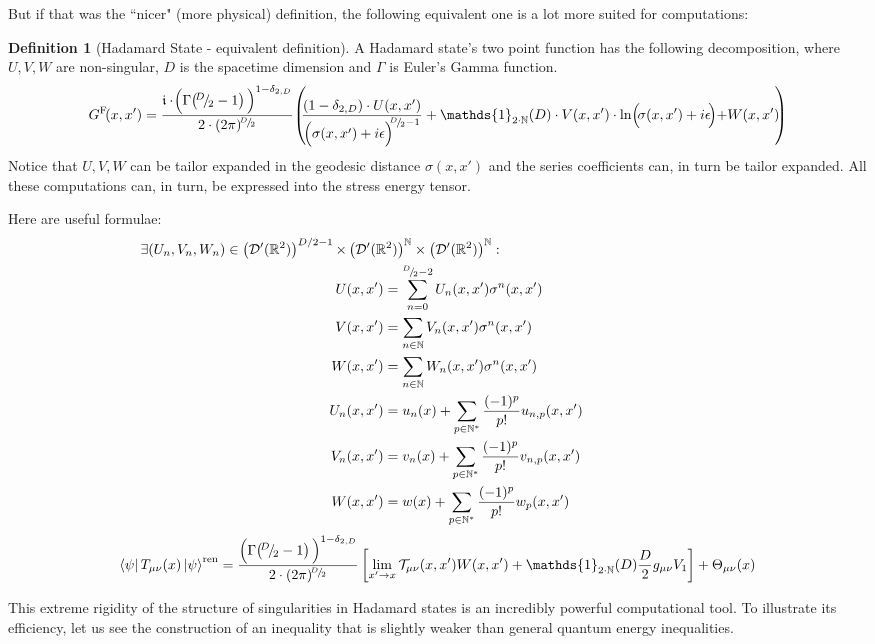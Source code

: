 \documentclass[a4paper,11pt]{article}
\numberwithin{equation}{section}
\theoremstyle{definition}
\newtheorem{definition}{Definition}
\begin{document}
But if that was the ``nicer" (more physical) definition, the following equivalent one is a lot more suited for computations:
\begin{definition}[Hadamard State - equivalent definition]
    A Hadamard state's two point function has the following decomposition, where $U,V,W$ are non-singular, $D$ is the spacetime dimension and $\Gamma$ is Euler's Gamma function.
    \begin{equation*}
G^\mathrm{F}\!(x,x')=\frac{\mathfrak{i}\cdot\!\Bigl(\Gamma\!\left(\!^D\!/_{\!2}-1\right)\Bigl)^{1-\delta_{2,D}}}{2\cdot(2\pi)^{\!^D\!/_{\!2}}}\!\left(\!\!\frac{(1-\delta_{2,D})\cdot U(x,x')}{\Bigl(\sigma(x,x')+i\epsilon\Bigl)^{\!\!^D\!/_{\!2}-1}}+\mathds{1}_{2\cdot \mathbb{N}}(D) \cdot V(x,x')\cdot\mathrm{ln}\Bigl(\!\sigma(x,x')+i\epsilon\!\Bigl)+W(x,x')\!\!\right)
\end{equation*}
Notice that $U,V,W$ can be tailor expanded in the geodesic distance $\sigma(x,x')$ and the series coefficients can, in turn be tailor expanded. All these computations can, in turn, be expressed into the stress energy tensor.

Here are useful formulae:
\begin{align}
    \exists (U_n, V_n, W_n) \in \left(\mathcal{D}'(\mathbb{R}^2)\right)^{D/2-1}\times & \left(\mathcal{D}'(\mathbb{R}^2)\right)^\mathbb{N}\times\left(\mathcal{D}'(\mathbb{R}^2)\right)^\mathbb{N}:\notag\\
    U&(x,x')=\sum_{n=0}^{^D\!/_{\!2}-2}U_n(x,x')\sigma^n(x,x')\notag\\
    V&(x,x')=\sum_{n\in\mathbb{N}}V_n(x,x')\sigma^n(x,x')\notag\\
    W&(x,x')=\sum_{n\in\mathbb{N}}W_n(x,x')\sigma^n(x,x')\notag\\
    U_n&(x,x')=u_n(x)+\sum_{p\in\mathbb{N}^*}\frac{(-1)^p}{p!}u_{n,p}(x,x')\\
    V_n&(x,x')=v_n(x)+\sum_{p\in\mathbb{N}^*}\frac{(-1)^p}{p!}v_{n,p}(x,x')
    \notag\quad\quad\quad\quad\quad\quad\quad\quad\quad\quad\quad\\
    W&(x,x')=w(x)+\sum_{p\in\mathbb{N}^*}\frac{(-1)^p}{p!}w_{p}(x,x')\notag
    \end{align}
    $$\bra{\psi}T_{\mu\nu}(x)\ket{\psi}^\mathrm{ren} = \frac{\Bigl(\Gamma\!\left(\!^D\!/_{\!2}-1\right)\Bigl)^{1-\delta_{2,D}}}{2\cdot(2\pi)^{\!^D\!/_{\!2}}}\left[\lim_{x'\to x}\mathcal{T}_{\mu\nu}(x,x')W(x,x')+\mathds{1}_{2\cdot \mathbb{N}}(D)\frac{D}{2}g_{\mu\nu}V_1\right]+\Theta_{\mu\nu}(x)$$

\end{definition}
This extreme rigidity of the structure of singularities in Hadamard states is an incredibly powerful computational tool. To illustrate its efficiency, let us see the construction of an inequality that is slightly weaker than general quantum energy inequalities.
\end{document}
